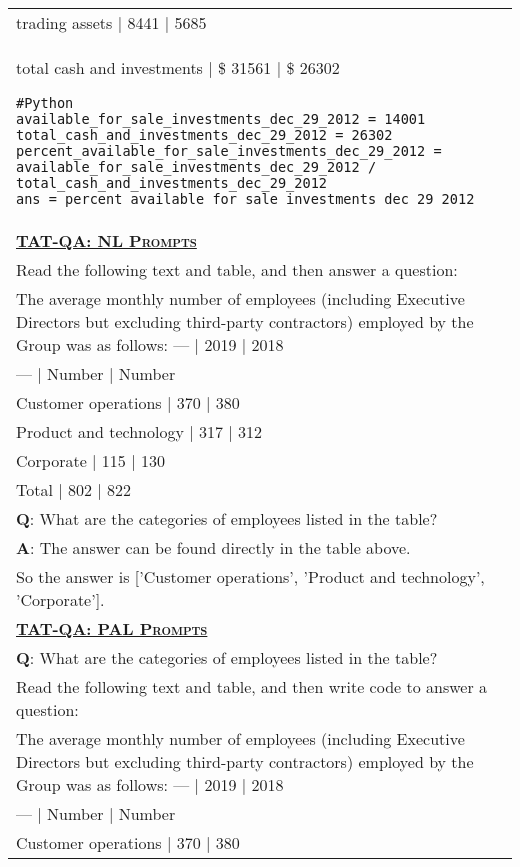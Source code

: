 \begin{table}[htbp]
\begin{tabular}{p{}}
trading assets | 8441 | 5685 \\
total cash and investments | \$ 31561 | \$ 26302 
\begin{verbatim}
#Python
available_for_sale_investments_dec_29_2012 = 14001
total_cash_and_investments_dec_29_2012 = 26302
percent_available_for_sale_investments_dec_29_2012 = available_for_sale_investments_dec_29_2012 / total_cash_and_investments_dec_29_2012
ans = percent_available_for_sale_investments_dec_29_2012
\end{verbatim}
\\
\midrule
\underline{\textbf{\textsc{TAT-QA: NL Prompts}}} \\
Read the following text and table, and then answer a question:\\
The average monthly number of employees (including Executive Directors but excluding third-party contractors) employed by the Group was as follows: — | 2019 | 2018 \\
— | Number | Number \\
Customer operations | 370 | 380 \\
Product and technology | 317 | 312 \\
Corporate | 115 | 130 \\
Total | 802 | 822 \\
\textbf{Q}: What are the categories of employees listed in the table? \\
        \textbf{A}: The answer can be found directly in the table above. \\
        So the answer is ['Customer operations', 'Product and technology', 'Corporate']. \\
\midrule
\underline{\textbf{\textsc{TAT-QA: PAL Prompts}}} \\
\textbf{Q}: What are the categories of employees listed in the table? \\
Read the following text and table, and then write code to answer a question: \\
The average monthly number of employees (including Executive Directors but excluding third-party contractors) employed by the Group was as follows:
— | 2019 | 2018 \\
— | Number | Number \\
Customer operations | 370 | 380 \\

\end{tabular}
\end{table}
